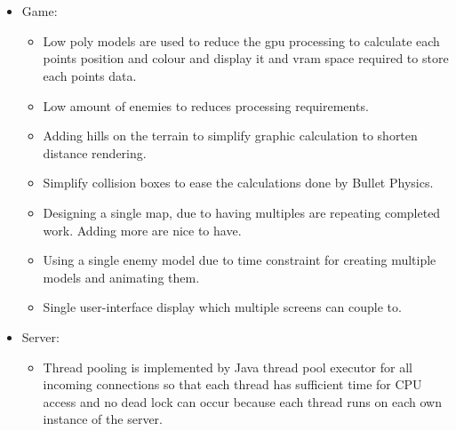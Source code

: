 \documentclass[letterpaper]{article}
\begin{document}
		\section*{\colorbox{black}{}}
		\vspace{0.1in}
			
			\begin{itemize}
				\item Game:
					\begin{itemize}
						\item Low poly models are used to reduce the gpu processing to calculate each points position and colour and display it and vram space required to store each points data.
						\item Low amount of enemies to reduces processing requirements.
						\item Adding hills on the terrain to simplify graphic calculation to shorten distance rendering.
						\item Simplify collision boxes to ease the calculations done by Bullet Physics.
						\item Designing a single map, due to having multiples are repeating completed work. Adding more are nice to have.
						\item Using a single enemy model due to time constraint for creating multiple models and animating them.
						\item Single user-interface display which multiple screens can couple to.
					\end{itemize}
				\item Server:
					\begin{itemize}
						\item Thread pooling is implemented by Java thread pool executor for all incoming connections so that each thread has sufficient time for CPU access and no dead lock can occur because each thread runs on each own instance of the server.
					\end{itemize}
			\end{itemize}
			
		\vspace{0.2in}
		\section*{\colorbox{black}{}}
		\vspace{0.1in}
			
\end{document}
